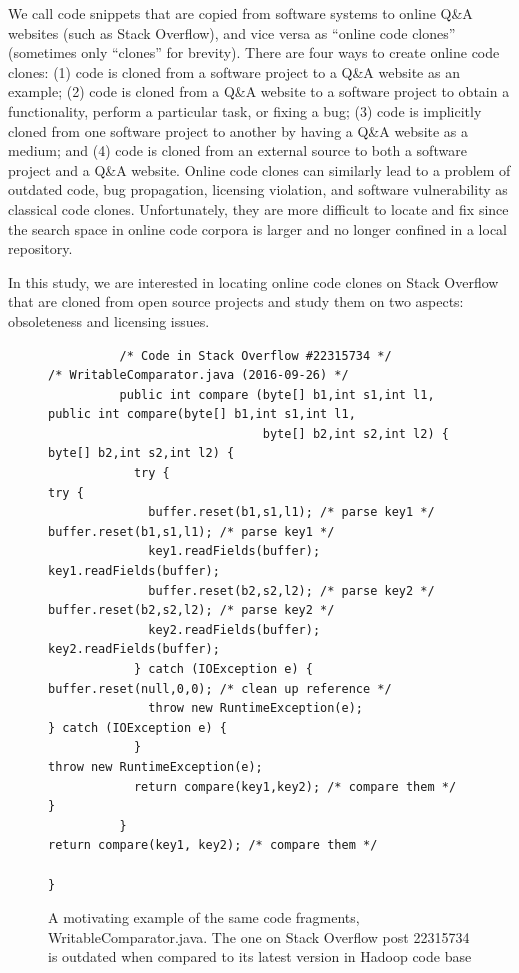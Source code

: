 \documentclass[sigconf,review, anonymous]{acmart}
\begin{document}

We call code snippets that are copied from software systems to online Q\&A websites (such as Stack Overflow), and vice versa as ``online code clones'' (sometimes only ``clones'' for brevity). There are four ways to create online code clones: (1) code is cloned from a software project to a Q\&A website as an example; (2) code is cloned from a Q\&A website to a software project to obtain a functionality, perform a particular task, or fixing a bug; (3) code is implicitly cloned from one software project to another by having a Q\&A website as a medium; and (4) code is cloned from an external source to both a software project and a Q\&A website. Online code clones can similarly lead to a problem of outdated code, bug propagation, licensing violation, and software vulnerability as classical code clones. Unfortunately, they are more difficult to locate and fix since the search space in online code corpora is larger and no longer confined in a local repository. 

In this study, we are interested in locating online code clones on Stack Overflow that are cloned from open source projects and study them on two aspects: obsoleteness and licensing issues. 

\begin{figure}
	\begin{lstlisting}
          /* Code in Stack Overflow #22315734 */                         /* WritableComparator.java (2016-09-26) */
          public int compare (byte[] b1,int s1,int l1,                   public int compare(byte[] b1,int s1,int l1,
                              byte[] b2,int s2,int l2) {                                    byte[] b2,int s2,int l2) {
            try {                                                          try {
              buffer.reset(b1,s1,l1); /* parse key1 */                       buffer.reset(b1,s1,l1); /* parse key1 */
              key1.readFields(buffer);                                       key1.readFields(buffer);
              buffer.reset(b2,s2,l2); /* parse key2 */                       buffer.reset(b2,s2,l2); /* parse key2 */
              key2.readFields(buffer);                                       key2.readFields(buffer);
            } catch (IOException e) {                                        buffer.reset(null,0,0); /* clean up reference */
              throw new RuntimeException(e);                               } catch (IOException e) {
            }                                                                throw new RuntimeException(e);
            return compare(key1,key2); /* compare them */                  }
          }                                                                return compare(key1, key2); /* compare them */
	                                                                       }
	\end{lstlisting}
	\caption{A motivating example of the same code fragments, WritableComparator.java. The one on Stack Overflow post 22315734 is outdated when compared to its latest version in Hadoop code base}
	\label{fig:before-after}
\end{figure}
\end{document}
